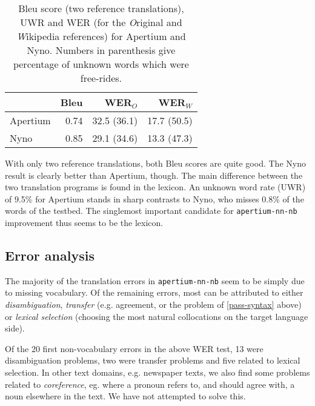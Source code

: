 \documentclass[11pt]{article}
\newcommand{\comment}[1]{\textbf{SKRIV} {\it #1}}
\renewcommand{\comment}[1]{}
\begin{document}
\begin{table}[htdp]
  \caption{{\sc Bleu} score (two reference translations), UWR and WER (for the \emph{O}riginal and \emph{W}ikipedia references) for Apertium and Nyno. Numbers in parenthesis give percentage of unknown words which were free-rides.}
\begin{center}
\begin{tabular}{|l|r|r|r|}
  \hline
  & {\sc Bleu} &  WER$_{O}$ & WER$_{W}$ \\
  \hline					 
  Apertium    & 0.74 & 32.5 (36.1) & 17.7 (50.5) \\
  Nyno        & 0.85 & 29.1 (34.6) &13.3 (47.3) \\
  \hline
\end{tabular}
\end{center}
\label{bleu}
\end{table}%

\comment{fjerna UWR frå tabellen, sidan det står nedanfor}

With only two reference translations, both {\sc Bleu} scores are quite
good. The Nyno result is clearly better than Apertium, though. The
main difference between the two translation programs is found in the
lexicon. An unknown word rate (UWR) of 9.5\% for Apertium stands in
sharp
contrasts to Nyno, who misses 0.8\% of the words of the testbed.
The singlemost important candidate for {\tt \small  apertium-nn-nb}
improvement thus seems to be the lexicon.


\subsection{Error analysis}
The majority of the translation errors in {\tt \small  apertium-nn-nb} seem to
be simply due to missing vocabulary. Of the remaining errors, most can
be attributed to either \emph{disambiguation}, \emph{transfer} (e.g.
agreement, or the problem of \ref{pass-syntax} above) or \emph{lexical
  selection} (choosing the most natural collocations on the target
language side).

Of the 20 first non-vocabulary errors in the above WER test, 13 were
disambiguation problems, two were transfer problems and five related
to lexical selection. In other text domains, e.g. newspaper texts, we
also find some problems related to \emph{coreference}, eg. where a
pronoun refers to, and should agree with, a noun elsewhere in the
text. We have not attempted to solve this.
\end{document}
